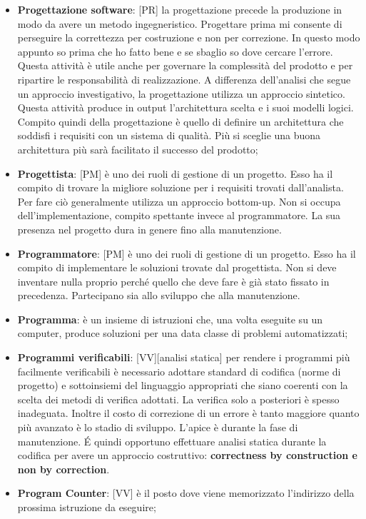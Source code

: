 \begin{itemize}
	\item \textbf{Progettazione software}: [PR] la progettazione precede la produzione in modo da avere un metodo ingegneristico. Progettare prima mi consente di perseguire la correttezza per costruzione e non per correzione. In questo modo appunto so prima che ho fatto bene e se sbaglio so dove cercare l'errore. Questa attività è utile anche per governare la complessità del prodotto e per ripartire le responsabilità di realizzazione. \newline
	A differenza dell'analisi che segue un approccio investigativo, la progettazione utilizza un approccio sintetico. Questa attività produce in output l'architettura scelta e i suoi modelli logici. \newline
	Compito quindi della progettazione è quello di definire un architettura che soddisfi i requisiti con un sistema di qualità. Più si sceglie una buona architettura più sarà facilitato il successo del prodotto;

	\item \textbf{Progettista}: [PM] è uno dei ruoli di gestione di un progetto. \newline
	Esso ha il compito di trovare la migliore soluzione per i requisiti trovati dall'analista. Per fare ciò generalmente utilizza un approccio bottom-up. \newline
Non si occupa dell'implementazione, compito spettante invece al programmatore. La sua presenza nel progetto dura in genere fino alla manutenzione.
	
	\item \textbf{Programmatore}: [PM] è uno dei ruoli di gestione di un progetto. 	\newline
Esso ha il compito di implementare le soluzioni trovate dal progettista. Non si deve inventare nulla proprio perché quello che deve fare è già stato fissato in precedenza. Partecipano sia allo sviluppo che alla manutenzione.

	\item \textbf{Programma}: è un insieme di istruzioni che, una volta eseguite su un computer, produce soluzioni per una data classe di problemi automatizzati;

	\item \textbf{Programmi verificabili}: [VV][analisi statica] per rendere i programmi più facilmente verificabili è necessario adottare standard di codifica (norme di progetto) e sottoinsiemi del linguaggio appropriati che siano coerenti con la scelta dei metodi di verifica adottati. La verifica solo a posteriori è spesso inadeguata. Inoltre il costo di correzione di un errore è tanto maggiore quanto più avanzato è lo stadio di sviluppo. L'apice è durante la fase di manutenzione. \'E quindi opportuno effettuare analisi statica durante la codifica per avere un approccio costruttivo: \textbf{correctness by construction e non by correction}. 

	\item \textbf{Program Counter}: [VV] è il posto dove viene memorizzato l'indirizzo della prossima istruzione da eseguire;
\end{itemize}